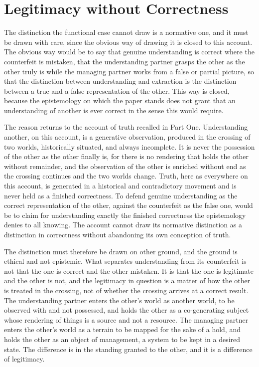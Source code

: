 \section{Legitimacy without Correctness}
\label{p27:sec:legitimacy}

\noindent
The distinction the functional case cannot draw is a normative one, and it must be drawn with care, since the obvious way of drawing it is closed to this account. The obvious way would be to say that genuine understanding is correct where the counterfeit is mistaken, that the understanding partner grasps the other as the other truly is while the managing partner works from a false or partial picture, so that the distinction between understanding and extraction is the distinction between a true and a false representation of the other. This way is closed, because the epistemology on which the paper stands does not grant that an understanding of another is ever correct in the sense this would require.

The reason returns to the account of truth recalled in Part One. Understanding another, on this account, is a generative observation, produced in the crossing of two worlds, historically situated, and always incomplete. It is never the possession of the other as the other finally is, for there is no rendering that holds the other without remainder, and the observation of the other is enriched without end as the crossing continues and the two worlds change. Truth, here as everywhere on this account, is generated in a historical and contradictory movement and is never held as a finished correctness. To defend genuine understanding as the correct representation of the other, against the counterfeit as the false one, would be to claim for understanding exactly the finished correctness the epistemology denies to all knowing. The account cannot draw its normative distinction as a distinction in correctness without abandoning its own conception of truth.

The distinction must therefore be drawn on other ground, and the ground is ethical and not epistemic. What separates understanding from its counterfeit is not that the one is correct and the other mistaken. It is that the one is legitimate and the other is not, and the legitimacy in question is a matter of how the other is treated in the crossing, not of whether the crossing arrives at a correct result. The understanding partner enters the other's world as another world, to be observed with and not possessed, and holds the other as a co-generating subject whose rendering of things is a source and not a resource. The managing partner enters the other's world as a terrain to be mapped for the sake of a hold, and holds the other as an object of management, a system to be kept in a desired state. The difference is in the standing granted to the other, and it is a difference of legitimacy.

